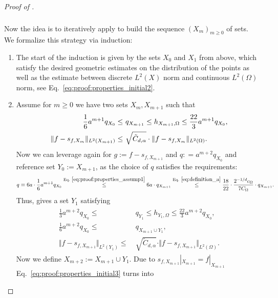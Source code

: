 \documentclass[a4paper, 10pt]{article}
\begin{document}
\begin{proof}[Proof of ]
\begin{align}
\begin{aligned}
\end{aligned}
\end{align}
Now the idea is to iteratively apply  to build the sequence $(X_m)_{m \geq 0}$ of sets. \\ 
We formalize this strategy via induction: 
\begin{enumerate}
\item The start of the induction is given by the sets $X_{0}$ and $X_{1}$ from above, 
which satisfy the desired geometric estimates on the distribution of the points as well as the estimate between discrete $L^2(X)$ norm and continuous $L^2(\Omega)$ norm, 
see Eq.~\eqref{eq:proof:properties_initial2}.
\item Assume for $m \geq 0$ we have two sets $X_{m}, X_{m+1}$ such that 
\begin{align}
\frac{1}{6} a^{m+1} q_{X_{0}} \leq& ~ q_{X_{m+1}} \leq h_{X_{m + 1}, \Omega} \leq \frac{22}{3} a^{m+1} q_{X_{0}}, \label{eq:proof:properties_assump1} \\
%
\Vert f - s_{f, X_{m}} \Vert_{L^2(X_{m + 1})} \leq& ~ \sqrt{\tilde{C}_{d, \alpha}} \cdot \Vert f - s_{f, X_{m}} \Vert_{L^2(\Omega)}. \notag %
\end{align}
Now we can leverage again  for $g := f - s_{f, X_{m+1}}$ and $q: = a^{m+2} q_{X_0}$ and reference set $Y_0 := X_{m+1}$, as the choice of $q$ satisfies the requirements:
\begin{align*}
q \equiv 6a \cdot \frac{1}{6} a^{m+1} q_{X_0} \stackrel{\text{Eq.}~\eqref{eq:proof:properties_assump1}}{\leq} 6a \cdot q_{X_{m+1}} \stackrel{\text{Eq.}~\eqref{eq:definition_a}}{\leq} \frac{18}{22} \cdot \frac{2^{-1/d} c_\Omega}{7C_\Omega} \cdot q_{X_{m+1}}.
\end{align*}
Thus,  gives a set $Y_1$ satisfying
\begin{align}
\begin{aligned}
\label{eq:proof:properties_initial3}
\frac{1}{3} a^{m+2} q_{X_0} \leq& ~ q_{Y_1} \leq h_{Y_1, \Omega} \leq \frac{22}{3} a ^{m+2} q_{X_0}, \\
\frac{1}{6} a^{m+2} q_{X_0} \leq& ~ q_{X_{m+1} \cup Y_1}, \\
\Vert f - s_{f, X_{m+1}} \Vert_{L^2(Y_1)} \leq& ~ \sqrt{\tilde{C}_{d, \alpha}} \cdot \Vert f - s_{f, X_{m+1}} \Vert_{L^2(\Omega)}. 
\end{aligned}
\end{align}
Now we define $X_{m+2} := X_{m+1} \cup Y_1$.
Due to $s_{f, X_{m+1}}|_{X_{m+1}} = f|_{X_{m+1}}$ Eq.~\eqref{eq:proof:properties_initial3} turns into

\end{enumerate}
\end{proof}
\end{document}
